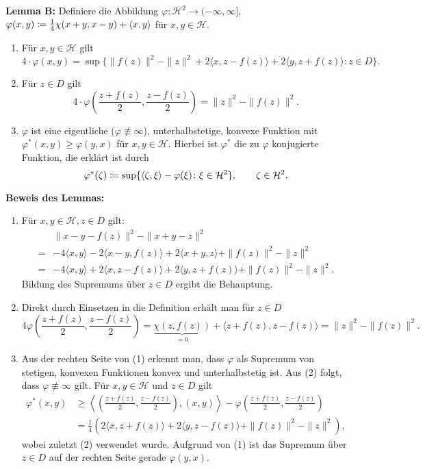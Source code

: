 \documentclass[a4paper,twoside,DIV15,BCOR12mm]{scrbook}
\newcommand{\HR}{\mathcal H}
\begin{document}
\begin{beweis}
\textbf{Lemma B:}
Definiere die Abbildung \(\varphi: \HR^2 \rightarrow (-\infty, \infty]\),\quad \(\varphi(x,y) \da \frac14 \chi(x+y,x-y) + \langle x,y \rangle\) für \( x,y\in\HR\).
\begin{enumerate}[(1)]
\item Für \(x,y \in \HR\) gilt
\[
4\cdot \varphi(x,y) = \sup\{ \|f(z)\|^2 - \|z\|^2 + 2 \langle x,z-f(z) \rangle + 2 \langle y,z+f(z) \rangle \colon z \in D\}.
\]
\item Für \(z \in D\) gilt
\[
4 \cdot \varphi(\frac{z+f(z)}2, \frac{z-f(z)}2) = \|z\|^2 - \|f(z)\|^2.
\]
\item \(\varphi\) ist eine eigentliche (\(\varphi \not\equiv \infty\)), unterhalbstetige, konvexe Funktion mit \(\varphi^\ast(x,y) \geq \varphi(y,x)\) für \(x,y\in \HR\). Hierbei ist \(\varphi^\ast\) die zu \(\varphi\) konjugierte Funktion, die erklärt ist durch
\[
\varphi^\ast(\zeta) \da \sup\{ \langle \zeta,\xi \rangle - \varphi(\xi) \colon \xi \in \HR^2 \},\qquad  \zeta \in \HR^2.
\]
\end{enumerate}

\textbf{Beweis des Lemmas:}
\begin{enumerate}[(1)]
\item Für \(x,y\in \HR, z \in D\) gilt:
\begin{align*}
&\|x-y-f(z)\|^2 - \|x+y-z\|^2\\
=& -4\langle x,y\rangle - 2\langle x-y, f(z)\rangle + 2\langle x+y, z\rangle + \|f(z)\|^2 - \|z\|^2 \\
=& -4\langle x,y\rangle + 2\langle x,z-f(z)\rangle + 2\langle y,z+f(z)\rangle + \|f(z)\|^2-\|z\|^2.
\end{align*}
Bildung des Supremums über $z\in D$ ergibt die Behauptung.
\item Direkt durch Einsetzen in die Definition erhält man für $z\in D$
\[
4\varphi(\frac{z+f(z)}2, \frac{z-f(z)}2) = \underbrace{\chi(z,f(z))}_{=0} + \langle z+f(z),z-f(z)\rangle = \|z\|^2 - \|f(z)\|^2.
\]
\item Aus der rechten Seite von (1) erkennt man, dass $\varphi$ als Supremum von stetigen, konvexen Funktionen  konvex und unterhalbstetig ist. Aus (2) folgt, dass $\varphi\not\equiv \infty$ gilt. Für $x,y\in\HR$ und $z\in D$ 
gilt
\begin{align*}
\varphi^*(x,y)&\ge \left\langle \left(\frac{z+f(z)}{2}, \frac{z-f(z)}{2}\right),(x,y)\right\rangle -\varphi\left(\frac{z+f(z)}{2}, \frac{z-f(z)}{2}\right)\\
&=\frac{1}{4}\left(2\langle x,z+f(z)\rangle +2\langle y,z-f(z)\rangle+\|f(z)\|^2-\|z\|^2\right),
\end{align*}
wobei zuletzt (2) verwendet wurde. Aufgrund von (1) ist das Supremum über $z\in D$ auf der rechten Seite 
gerade $\varphi(y,x)$. 
\end{enumerate}


\end{beweis}
\end{document}
